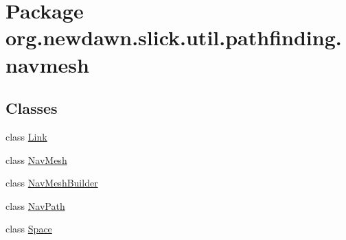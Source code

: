 \hypertarget{namespaceorg_1_1newdawn_1_1slick_1_1util_1_1pathfinding_1_1navmesh}{}\section{Package org.\+newdawn.\+slick.\+util.\+pathfinding.\+navmesh}
\label{namespaceorg_1_1newdawn_1_1slick_1_1util_1_1pathfinding_1_1navmesh}
\subsection*{Classes}
\begin{DoxyCompactItemize}
\item 
class \mbox{\hyperlink{classorg_1_1newdawn_1_1slick_1_1util_1_1pathfinding_1_1navmesh_1_1_link}{Link}}
\item 
class \mbox{\hyperlink{classorg_1_1newdawn_1_1slick_1_1util_1_1pathfinding_1_1navmesh_1_1_nav_mesh}{Nav\+Mesh}}
\item 
class \mbox{\hyperlink{classorg_1_1newdawn_1_1slick_1_1util_1_1pathfinding_1_1navmesh_1_1_nav_mesh_builder}{Nav\+Mesh\+Builder}}
\item 
class \mbox{\hyperlink{classorg_1_1newdawn_1_1slick_1_1util_1_1pathfinding_1_1navmesh_1_1_nav_path}{Nav\+Path}}
\item 
class \mbox{\hyperlink{classorg_1_1newdawn_1_1slick_1_1util_1_1pathfinding_1_1navmesh_1_1_space}{Space}}
\end{DoxyCompactItemize}
